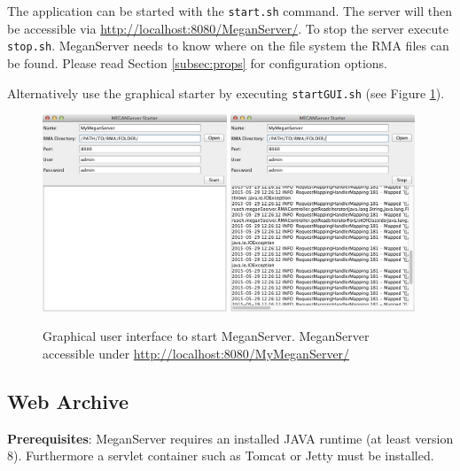 \documentclass[11pt]{article}
\begin{document}
The application can be started with the \texttt{start.sh} command. The server will then be accessible via \url{http://localhost:8080/MeganServer/}. To stop the server execute \texttt{stop.sh}. MeganServer needs to know where on the file system the RMA files can be found. Please read Section \ref{subsec:props} for configuration options.


Alternatively use the graphical starter by executing \texttt{startGUI.sh} (see Figure \ref{fig:starter}).
\begin{figure}[h!]

  \centering
    \includegraphics[width=0.49\textwidth]{ServerStarter1.png}
    \includegraphics[width=0.49\textwidth]{ServerStarter2.png}
    \caption{Graphical user interface to start MeganServer. MeganServer accessible under \url{http://localhost:8080/MyMeganServer/}}
    \label{fig:starter}
\end{figure}


\subsection{Web Archive}
\textbf{Prerequisites}: MeganServer requires an installed JAVA runtime (at least version 8). Furthermore a servlet container such as Tomcat or Jetty must be installed.
\end{document}
